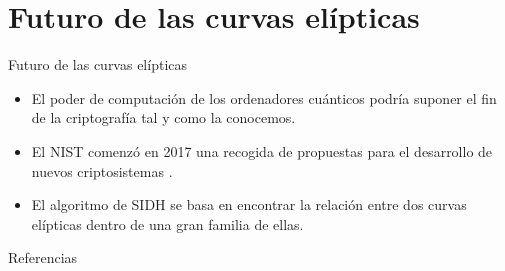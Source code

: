 \documentclass[spanish]{beamer}
\begin{document}
\section{Futuro de las curvas elípticas}
\begin{frame}[fragile]{Futuro de las curvas elípticas}
  \begin{itemize}
    \item El poder de computación de los ordenadores cuánticos podría suponer el fin de la criptografía tal y como la conocemos. %
    \item El NIST comenzó en 2017 una recogida de propuestas para el desarrollo de nuevos criptosistemas \parencite{computer_security_division_call_2017}. %
    \item El algoritmo de SIDH se basa en encontrar la relación entre dos curvas elípticas dentro de una gran familia de ellas.
    \end{itemize}
\end{frame}


\begin{frame}[t,allowframebreaks]{Referencias}
  \printbibliography[heading=none]
\end{frame}
\end{document}
